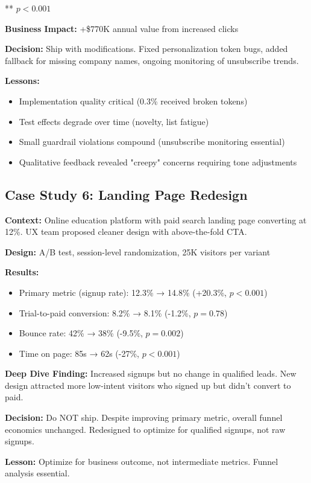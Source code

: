 ** $p < 0.001$

\textbf{Business Impact:} +\$770K annual value from increased clicks

\textbf{Decision:} Ship with modifications. Fixed personalization token bugs, added fallback for missing company names, ongoing monitoring of unsubscribe trends.

\textbf{Lessons:}
\begin{itemize}
    \item Implementation quality critical (0.3\% received broken tokens)
    \item Test effects degrade over time (novelty, list fatigue)
    \item Small guardrail violations compound (unsubscribe monitoring essential)
    \item Qualitative feedback revealed "creepy" concerns requiring tone adjustments
\end{itemize}

\subsection{Case Study 6: Landing Page Redesign}

\textbf{Context:} Online education platform with paid search landing page converting at 12\%. UX team proposed cleaner design with above-the-fold CTA.

\textbf{Design:} A/B test, session-level randomization, 25K visitors per variant

\textbf{Results:}
\begin{itemize}
    \item Primary metric (signup rate): 12.3\% → 14.8\% (+20.3\%, $p<0.001$)
    \item Trial-to-paid conversion: 8.2\% → 8.1\% (-1.2\%, $p=0.78$)
    \item Bounce rate: 42\% → 38\% (-9.5\%, $p=0.002$)
    \item Time on page: 85s → 62s (-27\%, $p<0.001$)
\end{itemize}

\textbf{Deep Dive Finding:} Increased signups but no change in qualified leads. New design attracted more low-intent visitors who signed up but didn't convert to paid.

\textbf{Decision:} Do NOT ship. Despite improving primary metric, overall funnel economics unchanged. Redesigned to optimize for qualified signups, not raw signups.

\textbf{Lesson:} Optimize for business outcome, not intermediate metrics. Funnel analysis essential.

